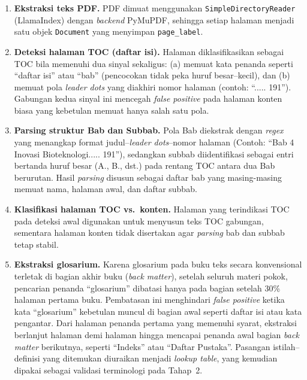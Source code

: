 \documentclass[../../thesis]{subfiles}
\begin{document}
\begin{enumerate}
  \item \textbf{Ekstraksi teks PDF.} PDF dimuat menggunakan
        \texttt{SimpleDirectoryReader} (LlamaIndex) dengan \textit{backend}
        PyMuPDF, sehingga setiap halaman menjadi satu objek \texttt{Document}
        yang menyimpan \texttt{page\_label}.

  \item \textbf{Deteksi halaman TOC (daftar isi).} Halaman diklasifikasikan
        sebagai TOC bila memenuhi dua sinyal sekaligus: (a) memuat kata penanda
        seperti ``daftar isi'' atau ``bab'' (pencocokan tidak peka huruf
        besar--kecil), dan (b) memuat pola \textit{leader dots} yang diakhiri
        nomor halaman (contoh: ``..... 191''). Gabungan kedua sinyal ini
        mencegah \textit{false positive} pada halaman konten biasa yang kebetulan
        memuat hanya salah satu pola.

  \item \textbf{Parsing struktur Bab dan Subbab.} Pola Bab diekstrak dengan
        \textit{regex} yang menangkap format judul--\textit{leader dots}--nomor
        halaman (Contoh: ``Bab 4 Inovasi Bioteknologi..... 191''), sedangkan
        subbab diidentifikasi sebagai entri bertanda huruf besar (A., B., dst.)
        pada rentang TOC antara dua Bab berurutan. Hasil \textit{parsing}
        disusun sebagai daftar bab yang masing-masing memuat nama, halaman
        awal, dan daftar subbab.

  \item \textbf{Klasifikasi halaman TOC vs.\ konten.} Halaman yang terindikasi
        TOC pada deteksi awal digunakan untuk menyusun teks TOC gabungan,
        sementara halaman konten tidak disertakan agar \textit{parsing} bab dan
        subbab tetap stabil.

  \item \textbf{Ekstraksi glosarium.} Karena glosarium pada buku teks secara
        konvensional terletak di bagian akhir buku (\textit{back matter}),
        setelah seluruh materi pokok, pencarian penanda ``glosarium'' dibatasi
        hanya pada bagian setelah 30\% halaman pertama buku. Pembatasan ini
        menghindari \textit{false positive} ketika kata ``glosarium'' kebetulan
        muncul di bagian awal seperti daftar isi atau kata pengantar. Dari
        halaman penanda pertama yang memenuhi syarat, ekstraksi berlanjut halaman
        demi halaman hingga mencapai penanda awal bagian \textit{back matter}
        berikutnya, seperti ``Indeks'' atau ``Daftar Pustaka''. Pasangan
        istilah--definisi yang ditemukan diuraikan menjadi \textit{lookup table},
        yang kemudian dipakai sebagai validasi terminologi pada Tahap~2.


\end{enumerate}
\end{document}
